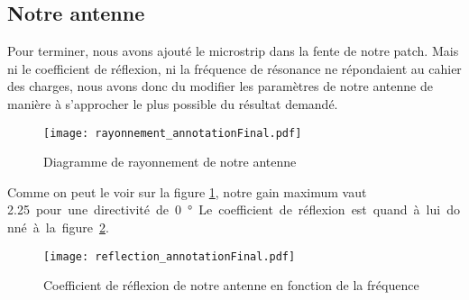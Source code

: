\subsection{Notre antenne}
Pour terminer, nous avons ajouté le microstrip dans la fente de notre patch. Mais ni le coefficient de réflexion, ni la fréquence de résonance ne répondaient au cahier des charges, nous avons donc du modifier les paramètres de notre antenne de manière à s'approcher le plus possible du résultat demandé.
\begin{figure}[htbp]
\centering
\texttt{[image: rayonnement\_annotationFinal.pdf]}
\caption{Diagramme de rayonnement de notre antenne}
\label{fig:rayonnement_annotationFinal}
\end{figure}
Comme on peut le voir sur la figure \ref{fig:rayonnement_annotationFinal}, notre gain maximum vaut \SI{2.25} pour une directivité de \SI{0}{\degree}. Le coefficient de réflexion est quand à lui donné à la figure \ref{fig:reflection_annotationFinal}.
\begin{figure}[htbp]
\centering
\texttt{[image: reflection\_annotationFinal.pdf]}
\caption{Coefficient de réflexion de notre antenne en fonction de la fréquence}
\label{fig:reflection_annotationFinal}
\end{figure}


